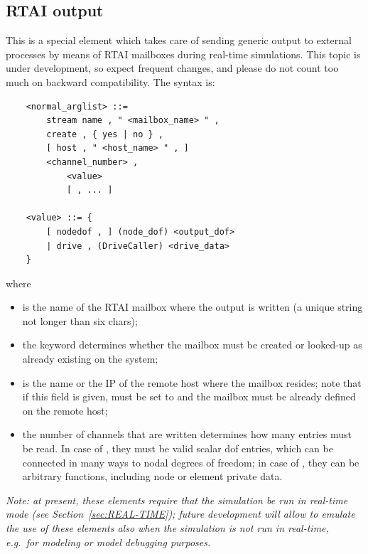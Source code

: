 \subsection{RTAI output}\label{sec:EL:BASE:RTAI_out}
This is a special element which takes care of sending generic output
to external processes by means of RTAI mailboxes during real-time 
simulations.
This topic is under development, so expect frequent changes, and
please do not count too much on backward compatibility.
The syntax is:
\begin{verbatim}
    <normal_arglist> ::=
        stream name , " <mailbox_name> " ,
        create , { yes | no } ,
        [ host , " <host_name> " , ]
        <channel_number> ,
            <value>
            [ , ... ]

    <value> ::= {
        [ nodedof , ] (node_dof) <output_dof>
        | drive , (DriveCaller) <drive_data>
    }
\end{verbatim}
where
\begin{itemize}
\item {} is the name of the RTAI mailbox where 
the output is written  (a unique string not longer than six chars);
\item the  keyword determines whether the mailbox
must be created or looked-up as already existing on the system;
\item {} is the name or the IP of the remote host where
the mailbox resides; note that if this field is given,  must
be set to  and the mailbox must be already defined
on the remote host;
\item the number of channels  that are written
determines how many  entries must be read.
In case of , they must be valid scalar dof entries,
which can be connected in many ways to nodal degrees of freedom;
in case of , they can be arbitrary functions,
including node or element private data.
\end{itemize}

\emph{Note: at present, these elements require that the simulation
be run in real-time mode (see Section~\ref{sec:REAL-TIME});
future development will allow to emulate the use of these elements
also when the simulation is not run in real-time, e.g.\ for modeling
or model debugging purposes.}






